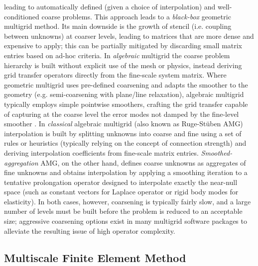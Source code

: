 leading to automatically defined (given a choice of interpolation) and well-conditioned coarse problems.   This approach leads to a \textit{black-box} geometric multigrid \cite{Dendy1982} method.   Its main downside is the growth of stencil (i.e. coupling between unknowns) at coarser levels, leading to matrices that are more dense and expensive to apply; this can be partially mitigated by discarding small matrix entries based on ad-hoc criteria.   In \textit{algebraic} multigrid the coarse problem hierarchy is built without explicit use of the mesh or physics, instead deriving grid transfer operators directly from the fine-scale system matrix.   Where geometric multigrid uses pre-defined coarsening and adapts the smoother to the geometry (e.g. semi-coarsening with plane/line relaxation), algebraic multigrid typically employs simple pointwise smoothers, crafting the grid transfer capable of capturing at the coarse level the error modes not damped by the fine-level smoother \cite{Stueben2001}.   In \textit{classical} algebraic multigrid (also known as Ruge-St{\"u}ben AMG) interpolation is built by splitting unknowns into coarse and fine using a set of rules or heuristics (typically relying on the concept of connection strength) and deriving interpolation coefficients from fine-scale matrix entries.   \textit{Smoothed-aggregation} AMG, on the other hand, defines coarse unknowns as aggregates of fine unknowns and obtains interpolation by applying a smoothing iteration to a tentative prolongation operator designed to interpolate exactly the near-null space (such as constant vectors for Laplace operator or rigid body modes for elasticity).   In both cases, however, coarsening is typically fairly slow, and a large number of levels must be built before the problem is reduced to an acceptable size; aggressive coarsening options exist in many multigrid software packages to alleviate the resulting issue of high operator complexity.

\subsection{Multiscale Finite Element Method}
\label{subsec:related_work_msfe}

